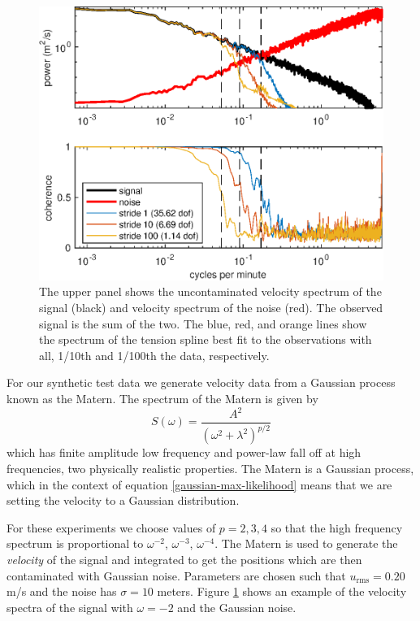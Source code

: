 \documentclass[10pt,journal]{IEEEtran}
\begin{document}
\begin{figure}[t]
  \centerline{\includegraphics[width=33pc,angle=0]{figures/synthetic_process_and_spectrum_slope2degree3}}
  
  \caption{The upper panel shows the uncontaminated velocity spectrum of the signal (black) and velocity spectrum of the noise (red). The observed signal is the sum of the two. The blue, red, and orange lines show the spectrum of the tension spline best fit to the observations with all, 1/10th and 1/100th the data, respectively. }
  \label{synthetic_process_and_spectrum}
\end{figure}

For our synthetic test data we generate velocity data from a Gaussian process known as the Matern. The spectrum of the Matern is given by
\begin{equation}
S(\omega) = \frac{A^2}{(\omega^2 + \lambda^2)^{p/2}}
\end{equation}
which has finite amplitude low frequency and power-law fall off at high frequencies, two physically realistic properties. The Matern is a Gaussian process, which in the context of equation \ref{gaussian-max-likelihood} means that we are setting the velocity to a Gaussian distribution.

For these experiments we choose values of $p=2,3,4$ so that the high frequency spectrum is proportional to $\omega^{-2}$, $\omega^{-3}$, $\omega^{-4}$. The Matern is used to generate the \emph{velocity} of the signal and integrated to get the positions which are then contaminated with Gaussian noise. Parameters are chosen such that $u_{\textrm{rms}}=0.20$ m/s and the noise has $\sigma=10$ meters. Figure \ref{synthetic_process_and_spectrum} shows an example of the velocity spectra of the signal with $\omega=-2$ and the Gaussian noise.
\end{document}
